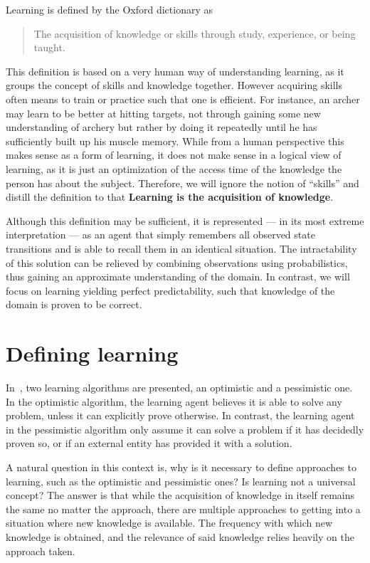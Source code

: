 \documentclass[\master/Master.tex]{subfiles}
\begin{document}
	
	Learning is defined by the Oxford dictionary as 
	\begin{quote}
		The acquisition of knowledge or skills through study, experience, or being taught.
	\end{quote}
	
	This definition is based on a very human way of understanding learning, as it groups the concept of skills and knowledge together.
	However acquiring skills often means to train or practice such that one is efficient. For instance, an archer may learn to be better at hitting targets, 
	not through gaining some new understanding of archery but rather by doing it repeatedly until he has sufficiently built up his muscle memory.
	While from a human perspective this makes sense as a form of learning, 
	it does not make sense in a logical view of learning, as it is just an optimization of the access time of the knowledge the person has about the subject.
    Therefore, we will ignore the notion of ``skills'' and distill the definition to that \textbf{Learning is the acquisition of knowledge}.
    
    Although this definition may be sufficient, it is represented --- in its most extreme interpretation --- as an agent that simply remembers all observed state transitions and is able to recall them in an identical situation. The intractability of this solution can be relieved by combining observations using probabilistics, thus gaining an approximate understanding of the domain. In contrast, we will focus on learning yielding perfect predictability, such that knowledge of the domain is proven to be correct.

\section{Defining learning}
	
	In~\cite{Walsh2008}, two learning algorithms are presented, an optimistic and a pessimistic one.
    In the optimistic algorithm, the learning agent believes it is able to solve any problem, unless it can explicitly prove otherwise. In contrast, the learning agent in the pessimistic algorithm only assume it can solve a problem if it has decidedly proven so, or if an external entity has provided it with a solution. 

A natural question in this context is, why is it necessary to define approaches to learning, such as the optimistic and pessimistic ones? Is learning not a universal concept? The answer is that while the acquisition of knowledge in itself remains the same no matter the approach, there are multiple approaches to getting into a situation where new knowledge is available. The frequency with which new knowledge is obtained, and the relevance of said knowledge relies heavily on the approach taken.
\end{document}

